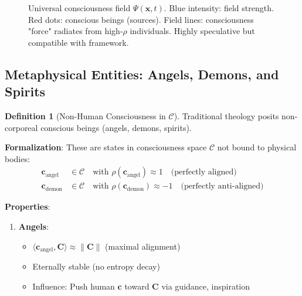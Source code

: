\documentclass[11pt,a4paper]{article}
\theoremstyle{definition}
\newtheorem{definition}{Definition}[section]
\theoremstyle{remark}
\newcommand{\CC}{\mathcal{C}}
\newcommand{\cc}{\mathbf{c}}
\begin{document}
\begin{enumerate}
\begin{figure}[H]
\caption{Universal consciousness field \(\Psi(\mathbf{x}, t)\). Blue intensity: field strength. Red dots: conscious beings (sources). Field lines: consciousness "force" radiates from high-\(\rho\) individuals. Highly speculative but compatible with framework.}
\label{fig:universal_psi_field}
\end{figure}

\subsection{Metaphysical Entities: Angels, Demons, and Spirits}

\begin{definition}[Non-Human Consciousness in \(\CC\)]
Traditional theology posits non-corporeal conscious beings (angels, demons, spirits).

\textbf{Formalization}: These are states in consciousness space \(\CC\) not bound to physical bodies:
\begin{align}
\cc_{\text{angel}} &\in \CC \quad \text{with } \rho(\cc_{\text{angel}}) \approx 1 \quad \text{(perfectly aligned)} \\
\cc_{\text{demon}} &\in \CC \quad \text{with } \rho(\cc_{\text{demon}}) \approx -1 \quad \text{(perfectly anti-aligned)}
\end{align}

\textbf{Properties}:
\begin{enumerate}
    \item \textbf{Angels}:
        \begin{itemize}
            \item \(\langle \cc_{\text{angel}}, \mathbf{C} \rangle \approx \|\mathbf{C}\|\) (maximal alignment)
            \item Eternally stable (no entropy decay)
            \item Influence: Push human \(\cc\) toward \(\mathbf{C}\) via guidance, inspiration
        \end{itemize}
    

\end{enumerate}
\end{definition}
\end{enumerate}
\end{document}
